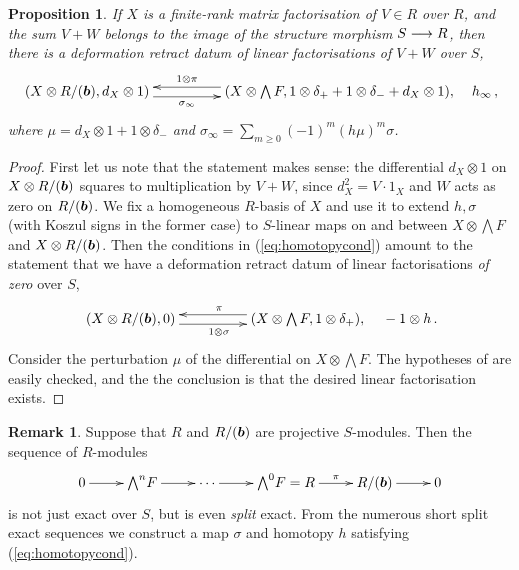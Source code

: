 \documentclass{compositio}
\newtheorem{proposition}[theorem]{Proposition}
\theoremstyle{definition}
\newtheorem{remark}[theorem]{Remark}
\numberwithin{equation}{section}
\begin{document}
\begin{proposition}\label{prop:pertapptechnical} If $X$ is a finite-rank matrix factorisation of $V \in R$ over $R$, and the sum $V + W$ belongs to the image of the structure morphism $S \longrightarrow R$, then there is a deformation retract datum of linear factorisations of $V+ W$ over $S$, 
\begin{equation}\label{eq:pre_perturb_htm3}
\xymatrix@C+2pc{
(X \otimes R/(\bb), d_X \otimes 1) \ar@<-0.8ex>[r]_-{\sigma_\infty} & (X \otimes \bigwedge F, 1 \otimes \delta_+ + 1 \otimes \delta_{-} + d_X \otimes 1), \ar@<-0.8ex>[l]_-{1 \otimes \pi}
} \quad h_\infty\,,
\end{equation}
where $\mu = d_X \otimes 1 + 1 \otimes \delta_-$ and $\sigma_\infty = \sum_{m \ge 0} (-1)^m (h \mu)^m \sigma$.
\end{proposition}
\begin{proof}
First let us note that the statement makes sense: the differential $d_X \otimes 1$ on $X \otimes R/(\boldsymbol{b})$ squares to multiplication by $V + W$, since $d_X^2 = V \cdot 1_X$ and $W$ acts as zero on $R/(\boldsymbol{b})$. We fix a homogeneous $R$-basis of $X$ and use it to extend $h, \sigma$ (with Koszul signs in the former case) to $S$-linear maps on and between $X \otimes \bigwedge F$ and $X \otimes R/(\boldsymbol{b})$. Then the conditions in (\ref{eq:homotopycond}) amount to the statement that we have a deformation retract datum of linear factorisations \emph{of zero} over $S$, 
\[
\xymatrix@C+2pc{
(X \otimes R/(\bb), 0) \ar@<-0.8ex>[r]_{1 \otimes \sigma} & (X \otimes \bigwedge F, 1 \otimes \delta_+), \ar@<-0.8ex>[l]_{\pi}
} \quad - 1 \otimes h \, .
\]
Consider the perturbation $\mu$ of the differential on $X \otimes \bigwedge F$. The hypotheses of \cite[Proposition 6.1]{dm1102.2957} are easily checked, and the the conclusion is that the desired linear factorisation exists.
\end{proof}

\begin{remark}\label{remark:splitexactsequenceskos}
Suppose that $R$ and $R/(\boldsymbol{b})$ are projective $S$-modules. Then the sequence of $R$-modules
\begin{equation}\label{eq:koszulexactseq}
\xymatrix{
0 \ar[r] & {\bigwedge}^n F \ar[r] & \cdots \ar[r] & {\bigwedge}^0 F = R \ar[r]^-{\pi} & R/(\bb) \ar[r] & 0
}
\end{equation}
is not just exact over $S$, but is even \emph{split} exact. From the numerous short split exact sequences we construct a map $\sigma$ and homotopy $h$ satisfying (\ref{eq:homotopycond}).
\end{remark}
\end{document}
